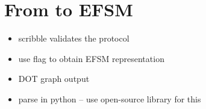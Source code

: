 \section{From  to EFSM}

\begin{itemize}
\item scribble validates the protocol
\item use flag to obtain EFSM representation
\item DOT graph output
\item parse in python -- use open-source library for this
\end{itemize}